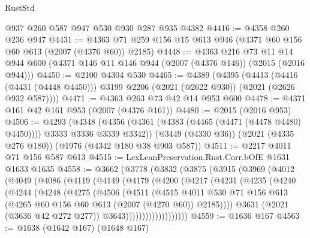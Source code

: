 \begin{lexlean}{RustStd}
\begin{coremodule}
    @937
    @260
    @587
    @947
    @530
    @930
    @287
    @935
    @4382
@4416 := @4358 @260 @236 @947
@4431 := @4363 @71 @259 @156 @15 @613 @946 (@4371 @60 @156 @60 @613 (@2007 (@4376 @60)) @2185)
@4448 := @4363
    @216
    @73
    @11
    @14
    @944
    @600
    (@4371 @146 @11 @146 @944 (@2007 (@4376 @146)) (@2015 (@2016 @944)))
@4450 := @2100 @4304 @530
@4465 := @4389
    (@4395
      (@4413
        (@4416 (@4431 (@4448 @4450)))
        @3199
        @2206
        (@2021 (@2622 @930))
        (@2021 (@2626 @932 @587))))
@4471 := @4363 @263 @73 @42 @14 @953 @600
@4478 := @4371 @161 @42 @161 @953 (@2007 (@4376 @161))
@4480 := @2015 (@2016 @953)
@4506 := @4293
    (@4348 (@4356 (@4361 (@4383 (@4465 (@4471 (@4478 @4480) @4450)))) @3333 @3336 @3339 @3342))
    (@3449 (@4330 @36))
    (@2021 (@4335 @276 @180))
    (@1976 (@4342 @180 @38 @903 @587))
@4511 := @2217 @4011 @71 @156 @587 @613
@4515 := LexLeanPreservation.Rust.Corr.bOfE @1631 @1633 @1635
@4558 := @3662
    (@3778
      (@3832
        (@3875
          (@3915
            (@3969
              (@4012
                (@4049
                  (@4086
                    (@4119
                      (@4149
                        (@4179
                          (@4200
                            (@4217
                              (@4231
                                (@4235
                                  (@4240
                                    (@4244
                                      (@4248
                                        (@4275
                                          (@4506
                                            (@4511
                                              (@4515
                                                @4011
                                                @530
                                                @71
                                                @156
                                                @613
                                                (@4265
                                                  @60
                                                  @156
                                                  @60
                                                  @613
                                                  (@2007 (@4270 @60))
                                                  @2185))))
                                          @3631
                                          (@2021 (@3636 @42 @272 @277))
                                          @3643)))))))))))))))))))
@4559 := @1636 @167
@4563 := @1638 (@1642 @167) (@1648 @167)

\end{coremodule}
\end{lexlean}
